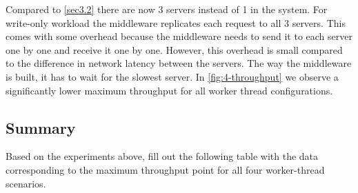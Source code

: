 \documentclass[11pt,a4paper]{article}
\begin{document}
Compared to \autoref{sec3.2} there are now 3 servers instead of 1 in the system. For write-only workload the middleware replicates each request to all 3 servers. This comes with some overhead because the middleware needs to send it to each server one by one and receive it one by one. However, this overhead is small compared to the difference in network latency between the servers. The way the middleware is built, it has to wait for the slowest server. 
In \autoref{fig:4-throughput} we observe a significantly lower maximum throughput for all worker thread configurations. 


\subsection{Summary}

Based on the experiments above, fill out the following table with the data corresponding to the maximum throughput point for all four worker-thread scenarios.
\end{document}
